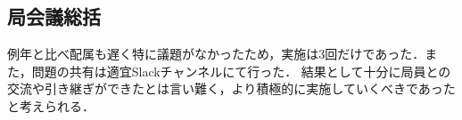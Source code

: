 \subsection*{局会議総括}


例年と比べ配属も遅く特に議題がなかったため，実施は3回だけであった．また，問題の共有は適宜Slackチャンネルにて行った．
結果として十分に局員との交流や引き継ぎができたとは言い難く，より積極的に実施していくべきであったと考えられる．
